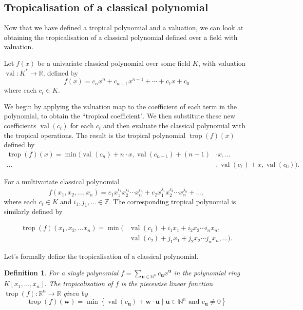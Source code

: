 \documentclass[11pt,reqno,a4paper]{article}
\theoremstyle{theoremstyle}
\theoremstyle{examplestyle}
\newtheorem{definition}[theorem]{Definition}
\theoremstyle{algorithmstyle}
\numberwithin{equation}{subsection}
\newcommand{\RR}{\mathbb{R}}
\newcommand{\ZZ}{\mathbb{Z}}
\newcommand{\NN}{\mathbb{N}}
\DeclareMathOperator{\trop}{trop}
\DeclareMathOperator{\val}{val}
\begin{document}
\subsection{Tropicalisation of a classical polynomial}
Now that we have defined a tropical polynomial and a valuation, we can look at obtaining the tropicalisation of a classical polynomial defined over a field with valuation. 
\vspace{1em}

Let $f(x)$ be a univariate classical polynomial over some field $K$, with valuation $\val:K^*\to\RR$, defined by \[f(x) = c_nx^n + c_{n-1}x^{n-1} + \cdots +c_1x + c_0\] where each $c_i \in K.$ 

We begin by applying the valuation map to the coefficient of each term in the polynomial, to obtain the ``tropical coefficient". We then substitute these new coefficients $\val(c_i)$ for each $c_i$ and then evaluate the classical polynomial with the tropical operations. The result is the tropical polynomial $\trop(f)(x)$ defined by
\begin{equation*}
\begin{aligned}
\trop(f)(x)  =  \min(\val(c_n)+n\cdot x,\val(c_{n-1})+(n-1)& \cdot x,\ldots\\
\ldots&, \val(c_1) + x, \val(c_0)).
\end{aligned}
\end{equation*}

For a multivariate classical polynomial \[f(x_1, x_2, \ldots,x_n) = c_1x_1^{i_1}x_2^{i_2}\cdots x_n^{i_n} + c_2x_1^{j_1}x_2^{j_2}\cdots x_n^{j_n}+\ldots,\] where each $c_i \in K$ and $i_1, j_1,\ldots \in \ZZ$. The corresponding tropical polynomial is similarly defined by

\begin{equation*}
\begin{aligned}
\trop(f)(x_1,x_2,\ldots x_n) =  \min(&\val(c_1) + i_1 x_1 + i_2 x_2 \cdots i_n x_n, \\
&\val(c_2) + j_1 x_1 + j_2 x_2 \cdots j_n x_n,\ldots).
\end{aligned}
\end{equation*}

Let's formally define the tropicalisation of a classical polynomial.

\begin{definition}
    For a single polynomial $f = \sum_{\mathbf{u}\in\NN^{n}}c_{\mathbf{u}}x^{\mathbf{u}}$ in the polynomial ring $K[x_1,\ldots,x_n]$. The \textit{tropicalisation} of $f$ is the piecewise linear function $\trop(f): \RR^n \to \RR$ given by 
    \begin{equation}
    \label{eqn:tropicalpoly}
        \trop(f)(\mathbf{w}) = \min \left\{ \val(c_\mathbf{u}) + \mathbf{w}\cdot\mathbf{u} \; | \;\mathbf{u} \in \NN^n \text{ and } c_\mathbf{u} \neq 0 \right\}
    \end{equation}
\end{definition}
\end{document}
